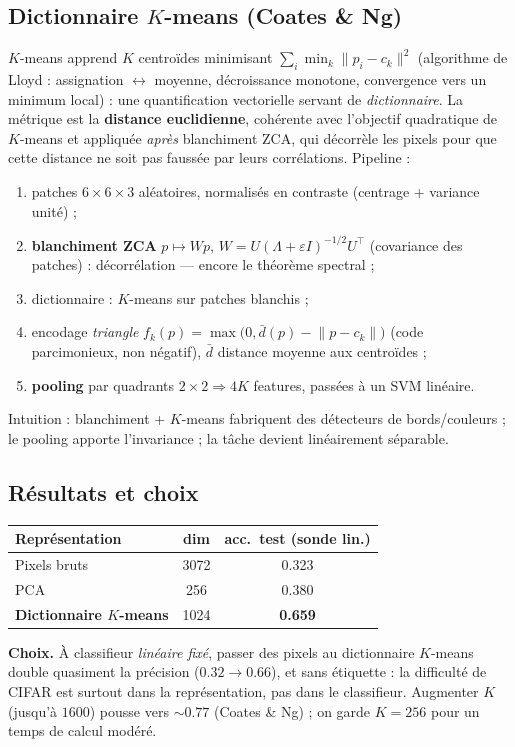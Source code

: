 \documentclass[11pt]{article}
\theoremstyle{remark}
\newcommand{\norm}[1]{\lVert #1 \rVert}
\newcommand{\T}{^{\top}}
\begin{document}
\subsection{Dictionnaire $K$-means (Coates \& Ng)}
$K$-means apprend $K$ centroïdes minimisant $\sum_i\min_k\norm{p_i-c_k}^2$
(algorithme de Lloyd : assignation $\leftrightarrow$ moyenne, décroissance
monotone, convergence vers un minimum local) : une quantification vectorielle
servant de \emph{dictionnaire}. La métrique est la \textbf{distance euclidienne},
cohérente avec l'objectif quadratique de $K$-means et appliquée \emph{après}
blanchiment ZCA, qui décorrèle les pixels pour que cette distance ne soit pas
faussée par leurs corrélations. Pipeline :
\begin{enumerate}\itemsep1pt
	\item patches $6\!\times\!6\!\times\!3$ aléatoires, normalisés en contraste
	(centrage + variance unité) ;
	\item \textbf{blanchiment ZCA} $p\mapsto Wp$, $W=U(\Lambda+\varepsilon I)^{-1/2}U\T$
	(covariance des patches) : décorrélation — encore le théorème spectral ;
	\item dictionnaire : $K$-means sur patches blanchis ;
	\item encodage \emph{triangle}
	$f_k(p)=\max\!\big(0,\bar d(p)-\norm{p-c_k}\big)$ (code parcimonieux, non négatif),
	$\bar d$ distance moyenne aux centroïdes ;
	\item \textbf{pooling} par quadrants $2\!\times\!2 \Rightarrow 4K$ features,
	passées à un SVM linéaire.
\end{enumerate}
Intuition : blanchiment + $K$-means fabriquent des détecteurs de bords/couleurs ;
le pooling apporte l'invariance ; la tâche devient linéairement séparable.

\subsection{Résultats et choix}
\begin{center}
	\begin{tabular}{lcc}
		\toprule
		Représentation & dim & acc.\ test (sonde lin.) \\
		\midrule
		Pixels bruts                       & 3072 & 0.323 \\
		PCA                                & 256  & 0.380 \\
		\textbf{Dictionnaire $K$-means}    & 1024 & \textbf{0.659} \\
		\bottomrule
	\end{tabular}
\end{center}
\noindent\textbf{Choix.} À classifieur \emph{linéaire fixé}, passer des pixels au
dictionnaire $K$-means double quasiment la précision ($0.32\!\to\!0.66$), et sans
étiquette : la difficulté de CIFAR est surtout dans la représentation, pas dans le
classifieur. Augmenter $K$ (jusqu'à $1600$) pousse vers $\sim0.77$ (Coates \& Ng) ;
on garde $K{=}256$ pour un temps de calcul modéré.
\end{document}

